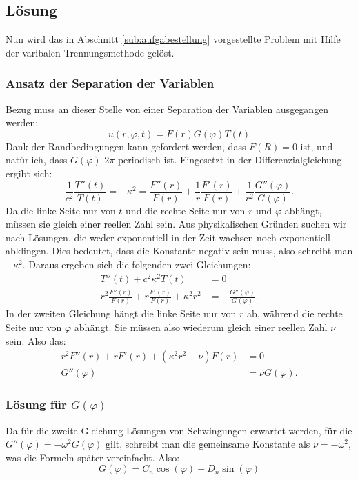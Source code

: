 \subsection{Lösung\label{sub:lösung1}}
Nun wird das in Abschnitt \ref{sub:aufgabestellung} vorgestellte Problem mit Hilfe der varibalen Trennungsmethode gelöst.
\subsubsection{Ansatz der Separation der Variablen\label{subsub:ansatz_separation}}
Bezug muss an dieser Stelle von einer Separation der Variablen ausgegangen werden:
\begin{equation*}
	u(r,\varphi, t) = F(r)G(\varphi)T(t)
\end{equation*}
Dank der Randbedingungen kann gefordert werden, dass $F(R)=0$ ist, und natürlich, dass $G(\varphi)$ $2\pi$ periodisch ist. Eingesetzt in der Differenzialgleichung ergibt sich:
\begin{equation*}
	\frac{1}{c^2}\frac{T''(t)}{T(t)}=-\kappa^2=\frac{F''(r)}{F(r)}+\frac{1}{r}\frac{F'(r)}{F(r)}+\frac{1}{r^2}\frac{G''(\varphi)}{G(\varphi)}.
\end{equation*}
Da die linke Seite nur von $t$ und die rechte Seite nur von $r$ und $\varphi$ abhängt, müssen sie gleich einer reellen Zahl sein. Aus physikalischen Gründen suchen wir nach Lösungen, die weder exponentiell in der Zeit wachsen noch exponentiell abklingen. Dies bedeutet, dass die Konstante negativ sein muss, also schreibt man $-\kappa^2$. Daraus ergeben sich die folgenden zwei Gleichungen:
\begin{align*}
	T''(t) + c^2\kappa^2T(t) &= 0\\
	r^2\frac{F''(r)}{F(r)} + r \frac{F'(r)}{F(r)} +\kappa^2 r^2 &= - \frac{G''(\varphi)}{G(\varphi)}.
\end{align*}
In der zweiten Gleichung hängt die linke Seite nur von $r$ ab, während die rechte Seite nur von $\varphi$ abhängt. Sie müssen also wiederum gleich einer reellen Zahl $\nu$ sein. Also das:
\begin{align*}
	r^2F''(r) + rF'(r) + (\kappa^2 r^2 - \nu)F(r) &= 0 \\
	G''(\varphi) &= \nu G(\varphi).
\end{align*}

\subsubsection{Lösung für $G(\varphi)$\label{subsub:lösung_G}}
Da für die zweite Gleichung Lösungen von Schwingungen erwartet werden, für die $G''(\varphi)=-\omega^2 G(\varphi)$ gilt, schreibt man die gemeinsame Konstante als $\nu=-\omega^2$, was die Formeln später vereinfacht. Also:
\begin{equation*}
 G(\varphi) = C_n \cos(\varphi) + D_n \sin(\varphi)
 \label{eq:cos_sin_überlagerung}
\end{equation*}

